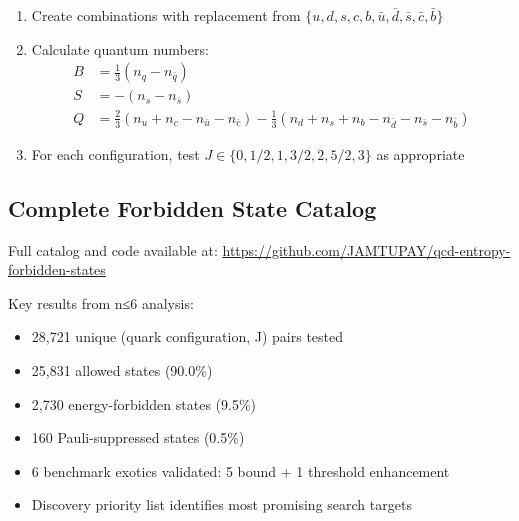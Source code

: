 \documentclass[12pt,a4paper]{article}
\begin{document}
\begin{enumerate}
\item Create combinations with replacement from $\{u,d,s,c,b,\bar{u},\bar{d},\bar{s},\bar{c},\bar{b}\}$
\item Calculate quantum numbers:
\begin{align}
B &= \frac{1}{3}(n_q - n_{\bar{q}}) \\
S &= -(n_s - n_{\bar{s}}) \\
Q &= \frac{2}{3}(n_u + n_c - n_{\bar{u}} - n_{\bar{c}}) - \frac{1}{3}(n_d + n_s + n_b - n_{\bar{d}} - n_{\bar{s}} - n_{\bar{b}})
\end{align}
\item For each configuration, test $J \in \{0, 1/2, 1, 3/2, 2, 5/2, 3\}$ as appropriate
\end{enumerate}

\subsection{Complete Forbidden State Catalog}

Full catalog and code available at: \url{https://github.com/JAMTUPAY/qcd-entropy-forbidden-states}

Key results from n≤6 analysis:
\begin{itemize}
\item 28,721 unique (quark configuration, J) pairs tested
\item 25,831 allowed states (90.0\%)
\item 2,730 energy-forbidden states (9.5\%)
\item 160 Pauli-suppressed states (0.5\%)
\item 6 benchmark exotics validated: 5 bound + 1 threshold enhancement
\item Discovery priority list identifies most promising search targets
\end{itemize}
\end{document}
